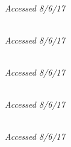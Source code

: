 \documentclass[a4paper]{article}
\begin{document}
\begin{thebibliography}{9}
\url{}
\textbf{}
\\\textit{Accessed 8/6/17}


\url{}
\textbf{}
\\\textit{Accessed 8/6/17}

\url{}
\textbf{}
\\\textit{Accessed 8/6/17}


\url{}
\textbf{}
\\\textit{Accessed 8/6/17}

\bibitem{}
\url{}
\textbf{}
\\\textit{Accessed 8/6/17}


\bibitem{}
\url{}
\textbf{}



\bibitem{}
\url{}
\textbf{}
\\\textit{}

\end{thebibliography}
\end{document}
